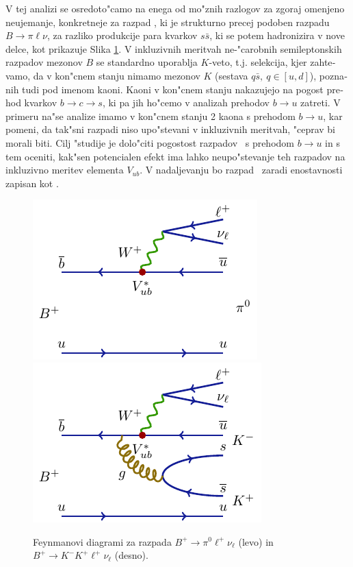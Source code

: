 \begin{otherlanguage}{slovene}
V tej analizi se osredoto"camo na enega od mo"znih razlogov za zgoraj omenjeno neujemanje, konkretneje za razpad \decayb, ki je strukturno precej podoben razpadu $B \to \pi \ell \nu$, za razliko produkcije para kvarkov $s \bar s$, ki se potem hadronizira v nove delce, kot prikazuje Slika \ref{feynman_si}. V inkluzivnih meritvah ne-"carobnih semileptonskih razpadov mezonov $B$ se standardno uporablja $K$-veto, t.j. selekcija, kjer zahtevamo, da v kon"cnem stanju nimamo mezonov $K$ (sestava $q \bar s,~q \in [u,d]$), poznanih tudi pod imenom kaoni. Kaoni v kon"cnem stanju nakazujejo na pogost prehod kvarkov $b \to c \to s$, ki pa jih ho"cemo v analizah prehodov $b \to u$ zatreti. V primeru na"se analize imamo v kon"cnem stanju 2 kaona s prehodom $b \to u$, kar pomeni, da tak"sni razpadi niso upo"stevani v inkluzivnih meritvah, "ceprav bi morali biti. Cilj "studije je dolo"citi pogostost razpadov \decayb~s prehodom $b\to u$ in s tem oceniti, kak"sen potencialen efekt ima lahko neupo"stevanje teh razpadov na inkluzivno meritev elementa $V_{ub}$. V nadaljevanju bo razpad \decayb~zaradi enostavnosti zapisan kot \decaya.
\begin{figure}[H]
\centering
\includegraphics{texfig/B2pilnu}
\hspace{1cm}
\includegraphics{texfig/B2KKlnu}
	\captionsetup{width=0.8\linewidth}
\caption{Feynmanovi diagrami za razpada $B^+ \to \pi^0 \ell^+ \nu_\ell$ (levo) in $B^+ \to K^- K^+ \ell^+ \nu_\ell$ (desno).}
\label{feynman_si}
\end{figure}


\end{otherlanguage}
